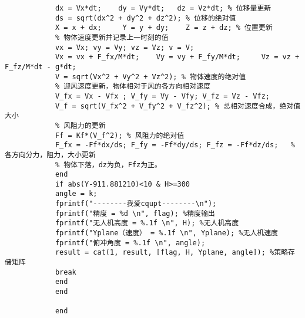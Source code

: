 \documentclass[normalsize]{ctexart}
\begin{document}
\begin{lstlisting}
			dx = Vx*dt;    dy = Vy*dt;   dz = Vz*dt; % 位移量更新
			ds = sqrt(dx^2 + dy^2 + dz^2); % 位移的绝对值
			X = x + dx;     Y = y + dy;    Z = z + dz; % 位置更新
			% 物体速度更新并记录上一时刻的值
			vx = Vx; vy = Vy; vz = Vz; v = V;
			Vx = vx + F_fx/M*dt;    Vy = vy + F_fy/M*dt;     Vz = vz + F_fz/M*dt - g*dt;
			V = sqrt(Vx^2 + Vy^2 + Vz^2); % 物体速度的绝对值
			% 迎风速度更新，物体相对于风的各方向相对速度
			V_fx = Vx - Vfx ; V_fy = Vy - Vfy; V_fz = Vz - Vfz;
			V_f = sqrt(V_fx^2 + V_fy^2 + V_fz^2); % 总相对速度合成，绝对值大小
			% 风阻力的更新
			Ff = Kf*(V_f^2); % 风阻力的绝对值
			F_fx = -Ff*dx/ds; F_fy = -Ff*dy/ds; F_fz = -Ff*dz/ds;   % 各方向分力，阻力，大小更新
			% 物体下落，dz为负，Ffz为正。
			end
			if abs(Y-911.881210)<10 & H>=300
			angle = k;
			fprintf("--------我爱cqupt--------\n");
			fprintf("精度 = %d \n", flag); %精度输出
			fprintf("无人机高度 = %.1f \n", H); %无人机高度
			fprintf("Yplane（速度） = %.1f \n", Yplane); %无人机速度 
			fprintf("俯冲角度 = %.1f \n", angle);  
			result = cat(1, result, [flag, H, Yplane, angle]); %策略存储矩阵
			break
			end
			end
			
			end
			

\end{lstlisting}
\end{document}
